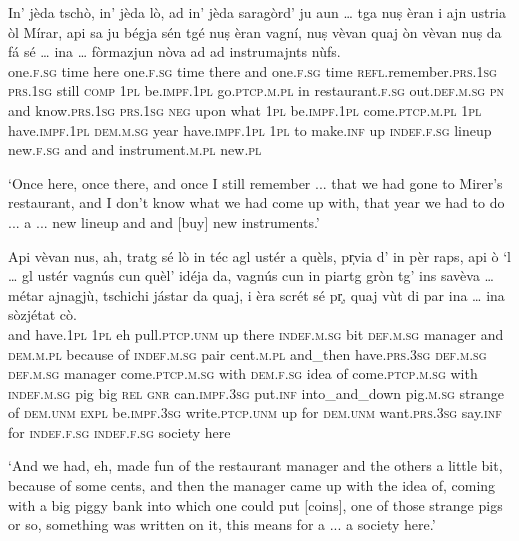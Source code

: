 \begin{linenumbers}
\gll    In’ jèda tschò, in’ jèda lò, ad in’ jèda saragòrd’ ju aun … tga nuṣ èran i ajn ustria òl Mírar, api sa ju bégja sén tgé nuṣ èran vagní, nuṣ vèvan quaj òn vèvan nuṣ da fá sé … ina … fòrmazjun nòva ad ad instrumajnts nùfs.\\
one.\textsc{f.sg} time here one.\textsc{f.sg} time there and one.\textsc{f.sg} time \textsc{refl}.remember.\textsc{prs.1sg} \textsc{prs.1sg} still {} \textsc{comp} \textsc{1pl} be.\textsc{impf.1pl} go.\textsc{ptcp.m.pl} in restaurant.\textsc{f.sg} out.\textsc{def.m.sg} \textsc{pn} and  know.\textsc{prs.1sg} \textsc{prs.1sg} \textsc{neg} upon what \textsc{1pl} be.\textsc{impf.1pl} come.\textsc{ptcp.m.pl} \textsc{1pl} have.\textsc{impf.1pl} \textsc{dem.m.sg} year have.\textsc{impf.1pl} \textsc{1pl} to make.\textsc{inf} up {} \textsc{indef.f.sg} {} lineup  new.\textsc{f.sg} and and instrument.\textsc{m.pl} new.\textsc{pl}\\
\end{linenumbers}
\medskip
\glt `Once here, once there, and once I still remember ... that we had gone to Mirer's restaurant, and I don't know what we had come up with, that year we had to do ... a ... new lineup and and [buy] new instruments.'
\medskip

\begin{linenumbers}
\gll  Api vèvan nus, ah, tratg sé lò in téc agl ustér a quèls, pr̩via d’ in pèr raps, api ò `l … gl ustér vagnús cun quèl’ idéja da, vagnús cun in piartg gròn tg’ ins savèva … métar ajnagjù, tschichi jástar da quaj, i èra scrét sé pr̩, quaj vùt di par ina … ina sòzjétat cò.\\
and have.\textsc{1pl} \textsc{1pl} eh pull.\textsc{ptcp.unm} up there \textsc{indef.m.sg} bit \textsc{def.m.sg} manager and \textsc{dem.m.pl} because of \textsc{indef.m.sg} pair cent.\textsc{m.pl} and\_then have.\textsc{prs.3sg} \textsc{def.m.sg} {} \textsc{def.m.sg} manager  come.\textsc{ptcp.m.sg}  with \textsc{dem.f.sg} idea of come.\textsc{ptcp.m.sg} with \textsc{indef.m.sg} pig big \textsc{rel} \textsc{gnr} can.\textsc{impf.3sg} {} put.\textsc{inf} into\_and\_down pig.\textsc{m.sg} strange of \textsc{dem.unm} \textsc{expl} be.\textsc{impf.3sg} write.\textsc{ptcp.unm} up for \textsc{dem.unm} want.\textsc{prs.3sg} say.\textsc{inf} for \textsc{indef.f.sg} {} \textsc{indef.f.sg} society here \\
\end{linenumbers}
\medskip
\glt `And we had, eh, made fun of the restaurant manager and the others a little bit, because of some cents, and then the manager came up with the idea of, coming with a big piggy bank into which one could put [coins], one of those strange pigs or so, something was written on it, this means for a ... a society here.'
\medskip

